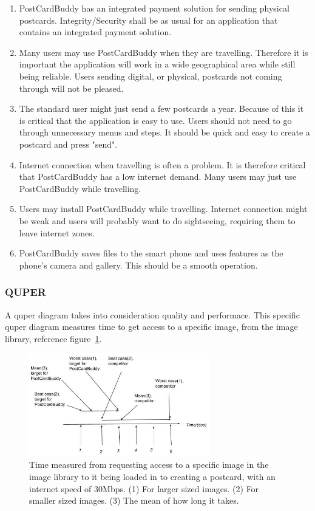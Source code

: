 \documentclass[10pt,a4paper]{article}
\begin{document}
\begin{enumerate}
\item PostCardBuddy has an integrated payment solution for sending physical postcards. Integrity/Security shall be as usual for an application that contains an integrated payment solution.
\item Many users may use PostCardBuddy when they are travelling. Therefore it is important the application will work in a wide geographical area while still being reliable. Users sending digital, or physical, postcards not coming through will not be pleased.
\item The standard user might just send a few postcards a year. Because of this it is critical that the application is easy to use. Users should not need to go through unnecessary menus and steps. It should be quick and easy to create a postcard and press "send".
\item Internet connection when travelling is often a problem. It is therefore critical that PostCardBuddy has a low internet demand. Many users may just use PostCardBuddy while travelling.
\item Users may install PostCardBuddy while travelling. Internet connection might be weak and users will probably want to do sightseeing, requiring them to leave internet zones.
\item PostCardBuddy saves files to the smart phone and uses features as the phone's camera and gallery. This should be a smooth operation.
\end{enumerate}

\subsubsection{QUPER}
A quper diagram takes into consideration quality and performace. This specific quper diagram measures time to get access to a specific image, from the image library, reference figure~\ref{fig:quper}.


\begin{figure}[h!]
\centering
\includegraphics[width=0.7\textwidth]{QUPER_v1.jpg}
\caption{Time measured from requesting access to a specific image in the image library to it being loaded in to creating a postcard, with an internet speed of 30Mbps.\newline
(1) For larger sized images. (2) For smaller sized images. (3) The mean of how long it takes. }
\label{fig:quper}
\end{figure}
\end{document}
